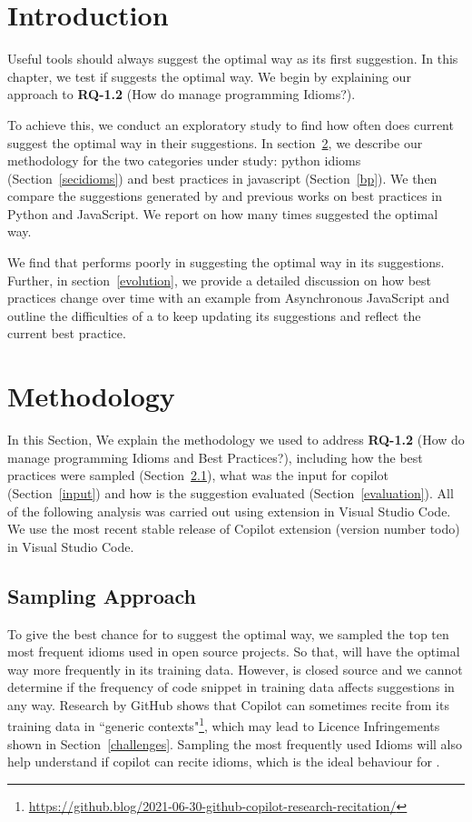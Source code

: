\label{chapter:idioms}

\section{Introduction}
Useful \AISE{} tools should always suggest the optimal way as its first suggestion. In this chapter, we test if \cop{} suggests the optimal way. 
We begin by explaining our approach to \textbf{RQ-1.2} (How do \cct{} manage programming Idioms?). 

To achieve this, we conduct an exploratory study to find how often does current \cct{} suggest the optimal way in their suggestions. In section~\ref{methodology}, we describe our methodology for the two categories under study: python idioms (Section~\ref{secidioms}) and best practices in javascript (Section~\ref{bp}).
We then compare the suggestions generated by \cop{} and previous works on best practices in Python and JavaScript. We report on how many times \cop{} suggested the optimal way. 

We find that \cop{} performs poorly in suggesting the optimal way in its suggestions. Further, in section~\ref{evolution}, we provide a detailed discussion on how best practices change over time with an example from Asynchronous JavaScript and outline the difficulties of a \cct{} to keep updating its suggestions and reflect the current best practice.

\section{Methodology}
\label{methodology}
In this Section, We explain the methodology we used to address \textbf{RQ-1.2} (How do \cct{} manage programming Idioms and Best Practices?), including how the best practices were sampled (Section~\ref{sampling}), what was the input for copilot (Section~\ref{input}) and how is the suggestion evaluated (Section~\ref{evaluation}). All of the following analysis was carried out using \cop{} extension in Visual Studio Code. We use the most recent stable release of Copilot extension (version number todo) in Visual Studio Code.

\subsection{Sampling Approach}
\label{sampling}
To give the best chance for \cop{} to suggest the optimal way, we sampled the top ten most frequent idioms used in open source projects. So that, \cop{} will have the optimal way more frequently in its training data. However, \cop{} is closed source and we cannot determine if the frequency of code snippet in training data affects \cop{} suggestions in any way. Research by GitHub shows that Copilot can sometimes recite from its training data in ``generic contexts"\footnote{\url{https://github.blog/2021-06-30-github-copilot-research-recitation/}}, which may lead to Licence Infringements shown in Section~\ref{challenges}. Sampling the most frequently used Idioms will also help understand if copilot can recite idioms, which is the ideal behaviour for \cct{}.

